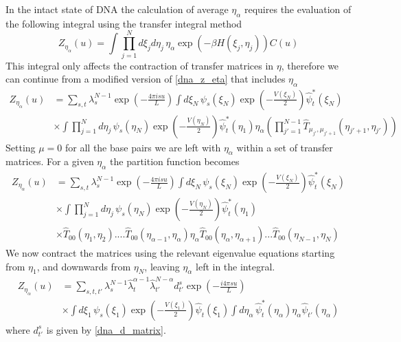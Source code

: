 In the intact state of DNA the calculation of average $\eta_{\alpha}$ requires the evaluation of the following integral using the transfer integral method
%
\begin{equation}
Z_{\eta_{\alpha}}\left(u\right)=\int \prod^{N}_{j=1}d\xi_{j}d\eta_{j}\,\eta_{\alpha}\exp\left(-\beta H\left(\xi_{j},\eta_{j}\right)\right)C\left(u\right)
\end{equation}
%
This integral only affects the contraction of transfer matrices in $\eta$, therefore we can continue from a modified version of \eqref{dna_z_eta} that includes $\eta_{\alpha}$
%
\begin{align}
\label{dna_mxd_z_eta}
Z_{\eta_{\alpha}}\left(u\right)&=\sum_{s,t}\lambda_{s}^{N-1}\exp\left(-\frac{4\pi isu}{L}\right)\int d\xi_{N}\,\psi_{s}\left(\xi_{N}\right)\exp\left(-\frac{V\left(\xi_{N}\right)}{2}\right)\hat{\psi}^{*}_{t}\left(\xi_{N}\right)\nonumber\\
&\times\int\prod_{j=1}^{N}d\eta_{j}\,\psi_{s}\left(\eta_{N}\right)\exp\left(-\frac{V\left(\eta_{N}\right)}{2}\right)\hat{\psi}_{t}^{*}\left(\eta_{1}\right)\eta_{\alpha}\left(\prod_{j'=1}^{N-1}\hat{T}_{\mu_{j'},\mu_{j'+1}}\left(\eta_{j'+1},\eta_{j'}\right)\right)
\end{align}
%
Setting $\mu=0$ for all the base pairs we are left with $\eta_{\alpha}$ within a set of transfer matrices. For a given $\eta_{\alpha}$ the partition function becomes
%
\begin{align}
\label{dna_mxd_z_eta2}
Z_{\eta_{\alpha}}\left(u\right)&=\sum_{s,t}\lambda_{s}^{N-1}\exp\left(-\frac{4\pi isu}{L}\right)\int d\xi_{N}\,\psi_{s}\left(\xi_{N}\right)\exp\left(-\frac{V\left(\xi_{N}\right)}{2}\right)\hat{\psi}^{*}_{t}\left(\xi_{N}\right)\nonumber\\
&\times\int\prod_{j=1}^{N}d\eta_{j}\,\psi_{s}\left(\eta_{N}\right)\exp\left(-\frac{V\left(\eta_{N}\right)}{2}\right)\hat{\psi}_{t}^{*}\left(\eta_{1}\right)\nonumber\\
&\times\hat{T}_{00}\left(\eta_{1},\eta_{2}\right)....\hat{T}_{00}\left(\eta_{\alpha-1},\eta_{\alpha}\right)\eta_{\alpha}\hat{T}_{00}\left(\eta_{\alpha},\eta_{\alpha+1}\right)...\hat{T}_{00}\left(\eta_{N-1},\eta_{N}\right)
\end{align}
%
We now contract the matrices using the relevant eigenvalue equations starting from $\eta_{1}$, and downwards from $\eta_{N}$, leaving $\eta_{\alpha}$ left in the integral. 
%
\begin{align}
\label{dna_mxd_z_eta3}
Z_{\eta_{\alpha}}\left(u\right)&=\sum_{s,t,t'}\lambda_{s}^{N-1}\hat{\lambda}_{t}^{\alpha-1}\hat{\lambda}_{t'}^{N-\alpha}d^{s}_{t'}\exp\left(-\frac{i4\pi s u}{L}\right)\nonumber\\
&\times\int d\xi_{1}\,\psi_{s}\left(\xi_{1}\right)\exp\left(-\frac{V\left(\xi_{1}\right)}{2}\right)\hat{\psi}_{t}\left(\xi_{1}\right)\int d\eta_{\alpha}\, \hat{\psi}^{*}_{t}\left(\eta_{\alpha}\right)\eta_{\alpha}\hat{\psi}_{t'}\left(\eta_{\alpha}\right)
\end{align}
%
where $d^{s}_{t'}$ is given by \eqref{dna_d_matrix}.

